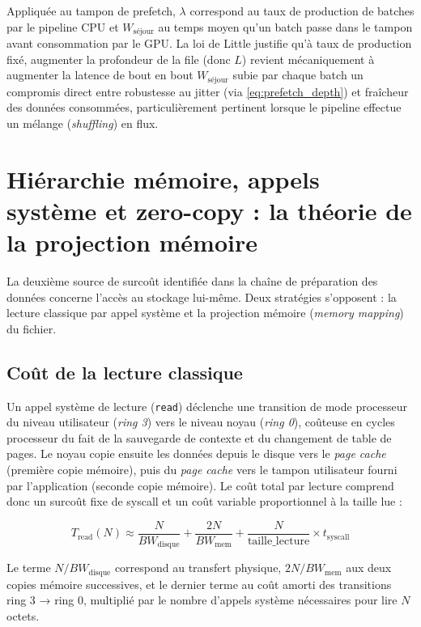 \documentclass[12pt,a4paper]{report}
\begin{document}
Appliquée au tampon de prefetch, $\lambda$ correspond au taux de production de batches par le pipeline CPU et $W_{\text{séjour}}$ au temps moyen qu'un batch passe dans le tampon avant consommation par le GPU. La loi de Little justifie qu'à taux de production fixé, augmenter la profondeur de la file (donc $L$) revient mécaniquement à augmenter la latence de bout en bout $W_{\text{séjour}}$ subie par chaque batch un compromis direct entre robustesse au jitter (via \eqref{eq:prefetch_depth}) et fraîcheur des données consommées, particulièrement pertinent lorsque le pipeline effectue un mélange (\textit{shuffling}) en flux.

\section{Hiérarchie mémoire, appels système et zero-copy : la théorie de la projection mémoire}
\label{sec:mmap}

La deuxième source de surcoût identifiée dans la chaîne de préparation des données concerne l'accès au stockage lui-même. Deux stratégies s'opposent : la lecture classique par appel système et la projection mémoire (\textit{memory mapping}) du fichier.

\subsection{Coût de la lecture classique}

Un appel système de lecture (\texttt{read}) déclenche une transition de mode processeur du niveau utilisateur (\textit{ring 3}) vers le niveau noyau (\textit{ring 0}), coûteuse en cycles processeur du fait de la sauvegarde de contexte et du changement de table de pages. Le noyau copie ensuite les données depuis le disque vers le \textit{page cache} (première copie mémoire), puis du \textit{page cache} vers le tampon utilisateur fourni par l'application (seconde copie mémoire). Le coût total par lecture comprend donc un surcoût fixe de syscall et un coût variable proportionnel à la taille lue :

\begin{equation}
\label{eq:read_cost}
T_{\text{read}}(N) \approx \frac{N}{BW_{\text{disque}}} + \frac{2N}{BW_{\text{mem}}} + \frac{N}{\text{taille\_lecture}} \times t_{\text{syscall}}
\end{equation}

Le terme $N/BW_{\text{disque}}$ correspond au transfert physique, $2N/BW_{\text{mem}}$ aux deux copies mémoire successives, et le dernier terme au coût amorti des transitions ring 3 → ring 0, multiplié par le nombre d'appels système nécessaires pour lire $N$ octets.
\end{document}
